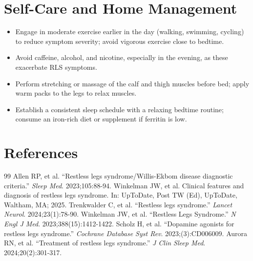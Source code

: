\section*{Self-Care and Home Management}
\begin{itemize}
  \item Engage in moderate exercise earlier in the day (walking, swimming, cycling) to reduce symptom severity; avoid vigorous exercise close to bedtime.
  \item Avoid caffeine, alcohol, and nicotine, especially in the evening, as these exacerbate RLS symptoms.
  \item Perform stretching or massage of the calf and thigh muscles before bed; apply warm packs to the legs to relax muscles.
  \item Establish a consistent sleep schedule with a relaxing bedtime routine; consume an iron-rich diet or supplement if ferritin is low.
\end{itemize}

\section*{References}
\begin{thebibliography}{99}
 Allen RP, et al. ``Restless legs syndrome/Willis-Ekbom disease diagnostic criteria.'' \emph{Sleep Med}. 2023;105:88-94.
 Winkelman JW, et al. Clinical features and diagnosis of restless legs syndrome. In: UpToDate, Post TW (Ed), UpToDate, Waltham, MA; 2025.
 Trenkwalder C, et al. ``Restless legs syndrome.'' \emph{Lancet Neurol}. 2024;23(1):78-90.
 Winkelman JW, et al. ``Restless Legs Syndrome.'' \emph{N Engl J Med}. 2023;388(15):1412-1422.
 Scholz H, et al. ``Dopamine agonists for restless legs syndrome.'' \emph{Cochrane Database Syst Rev}. 2023;(3):CD006009.
 Aurora RN, et al. ``Treatment of restless legs syndrome.'' \emph{J Clin Sleep Med}. 2024;20(2):301-317.
\end{thebibliography}
